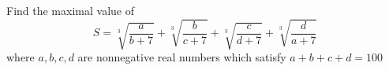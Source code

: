 Find the maximal value of
\[S = \sqrt[3]{\frac{a}{b+7}} + \sqrt[3]{\frac{b}{c+7}} + \sqrt[3]{\frac{c}{d+7}} + \sqrt[3]{\frac{d}{a+7}}\]
where $a, b, c, d$ are nonnegative real numbers which satisfy $a + b + c + d = 100$
